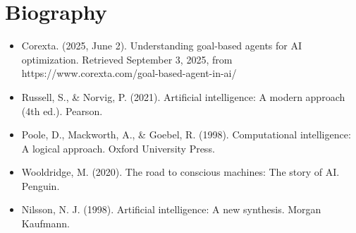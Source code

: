 \documentclass[letterpaper,12pt,oneside]{article}
\begin{document}
\section{Biography}
\begin{itemize}
    \item Corexta. (2025, June 2). Understanding goal-based agents for AI optimization. Retrieved September 3, 2025, from https://www.corexta.com/goal-based-agent-in-ai/
    \item Russell, S., \& Norvig, P. (2021). Artificial intelligence: A modern approach (4th ed.). Pearson.
    \item Poole, D., Mackworth, A., \& Goebel, R. (1998). Computational intelligence: A logical approach. Oxford University Press.
    \item Wooldridge, M. (2020). The road to conscious machines: The story of AI. Penguin.
    \item Nilsson, N. J. (1998). Artificial intelligence: A new synthesis. Morgan Kaufmann.
\end{itemize}
\end{document}
